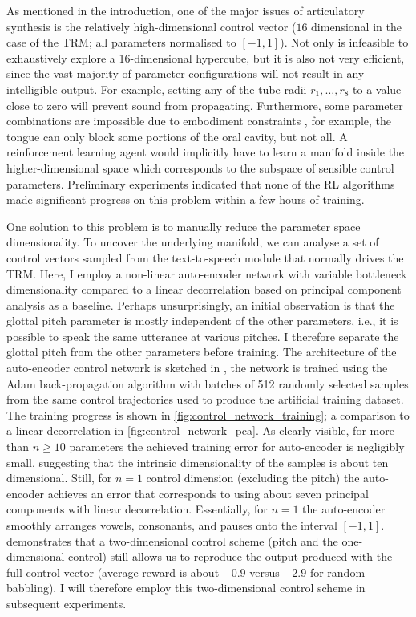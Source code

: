 \documentclass[letterpaper,10pt,conference]{ieeeconf}
\begin{document}
As mentioned in the introduction, one of the major issues of articulatory synthesis is the relatively high-dimensional control vector ($16$ dimensional in the case of the TRM; all parameters normalised to $[-1, 1]$). Not only is infeasible to exhaustively explore a 16-dimensional hypercube, but it is also not very efficient, since the vast majority of parameter configurations will not result in any intelligible output. For example, setting any of the tube radii $r_1, \ldots, r_8$ to a value close to zero will prevent sound from propagating. Furthermore, some parameter combinations are impossible due to embodiment constraints \cite{prom-on2013training}, for example, the tongue can only block some portions of the oral cavity, but not all. A reinforcement learning agent would implicitly have to learn a manifold inside the higher-dimensional space which corresponds to the subspace of sensible control parameters. Preliminary experiments indicated that none of the RL algorithms made significant progress on this problem within a few hours of training.

One solution to this problem is to manually reduce the parameter space dimensionality. To uncover the underlying manifold, we can analyse a set of control vectors sampled from the text-to-speech module that normally drives the TRM. Here, I employ a non-linear auto-encoder network with variable bottleneck dimensionality compared to a linear decorrelation based on principal component analysis as a baseline. Perhaps unsurprisingly, an initial observation is that the glottal pitch parameter is mostly independent of the other parameters, i.e., it is possible to speak the same utterance at various pitches. I therefore separate the glottal pitch from the other parameters before training. The architecture of the auto-encoder control network is sketched in , the network is trained using the Adam back-propagation algorithm with batches of 512 randomly selected samples from the same control trajectories used to produce the artificial training dataset. The training progress is shown in \cref{fig:control_network_training}; a comparison to a linear decorrelation in \cref{fig:control_network_pca}. As clearly visible, for more than $n \geq 10$ parameters the achieved training error for auto-encoder is negligibly small, suggesting that the intrinsic dimensionality of the samples is about ten dimensional. Still, for $n = 1$ control dimension (excluding the pitch) the auto-encoder achieves an error that corresponds to using about seven principal components with linear decorrelation. Essentially, for $n = 1$ the auto-encoder smoothly arranges vowels, consonants, and pauses onto the interval $[-1,1]$.  demonstrates that a two-dimensional control scheme (pitch and the one-dimensional control) still allows us to reproduce the output produced with the full control vector (average reward is about $-0.9$ versus $-2.9$ for random babbling). I will therefore employ this two-dimensional control scheme in subsequent experiments.
\end{document}
